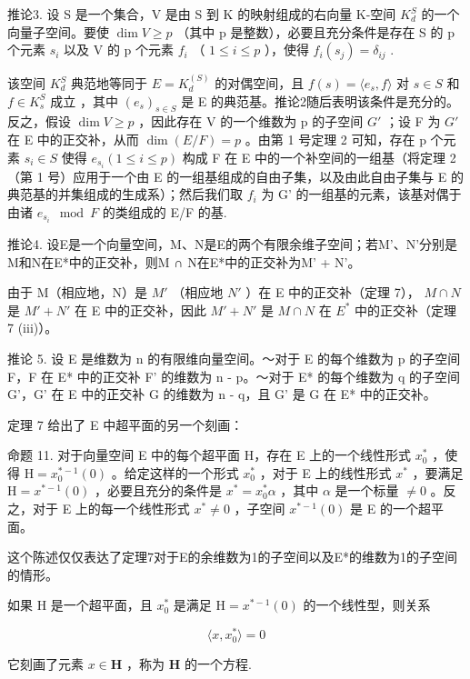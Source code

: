 推论3. 设 S 是一个集合，V 是由 S 到 K 的映射组成的右向量 K-空间 \(K_{d}^{S}\) 的一个向量子空间。要使 \(\dim V \geqslant p\) （其中 p 是整数），必要且充分条件是存在 S 的 p 个元素 \(s_{i}\) 以及 V 的 p 个元素 \(f_{i}\) （ \(1 \leqslant i \leqslant p\) ），使得 \(f_{i}(s_{j}) = \delta_{ij}\) .

该空间 \(K_{d}^{S}\) 典范地等同于 \(E = K_{d}^{(S)}\) 的对偶空间，且 \(f(s) = \langle e_{s}, f \rangle\) 对 \(s \in S\) 和 \(f \in K_{s}^{S}\) 成立 ，其中 \((e_{s})_{s \in S}\) 是 E 的典范基。推论2随后表明该条件是充分的。反之，假设 \(\dim V \geqslant p\) ，因此存在 V 的一个维数为 p 的子空间 \(G'\) ；设 F 为 \(G'\) 在 E 中的正交补，从而 \(\dim(E/F) = p\) 。由第 1 号定理 2 可知，存在 p 个元素 \(s_{i} \in S\) 使得 \(e_{s_{i}} (1 \leqslant i \leqslant p)\) 构成 F 在 E 中的一个补空间的一组基（将定理 2（第 1 号）应用于一个由 E 的一组基组成的自由子集，以及由此自由子集与 E 的典范基的并集组成的生成系）；然后我们取 \(f_{i}\) 为 G' 的一组基的元素，该基对偶于由诸 \(e_{s_{i}} \mod F\) 的类组成的 E/F 的基.

推论4. 设E是一个向量空间，M、N是E的两个有限余维子空间；若M'、N'分别是M和N在E*中的正交补，则M ∩ N在E*中的正交补为M' + N'。

由于 M（相应地，N）是 \(M'\) （相应地 \(N'\) ）在 E 中的正交补（定理 7）， \(M \cap N\) 是 \(M' + N'\) 在 E 中的正交补，因此 \(M' + N'\) 是 \(M \cap N\) 在 \(E^*\) 中的正交补（定理 7 (iii)）。

推论 5. 设 E 是维数为 n 的有限维向量空间。～对于 E 的每个维数为 p 的子空间 F，F 在 E* 中的正交补 F' 的维数为 n - p。～对于 E* 的每个维数为 q 的子空间 G'，G' 在 E 中的正交补 G 的维数为 n - q，且 G' 是 G 在 E* 中的正交补。

定理 7 给出了 E 中超平面的另一个刻画：

命题 11. 对于向量空间 E 中的每个超平面 H，存在 E 上的一个线性形式 \(x_0^*\) ，使得 \(\mathrm{H} = x_0^{*-1}(0)\) 。给定这样的一个形式 \(x_0^*\) ，对于 E 上的线性形式 \(x^*\) ，要满足 \(\mathrm{H} = x^{*-1}(0)\) ，必要且充分的条件是 \(x^* = x_0^*\alpha\) ，其中 \(\alpha\) 是一个标量 \(\neq 0\) 。反之，对于 E 上的每一个线性形式 \(x^* \neq 0\) ，子空间 \(x^{*-1}(0)\) 是 E 的一个超平面。

这个陈述仅仅表达了定理7对于E的余维数为1的子空间以及E*的维数为1的子空间的情形。

如果 H 是一个超平面，且 \(x_{0}^{*}\) 是满足 \(\mathrm{H}=x^{*-1}(0)\) 的一个线性型，则关系

\[
\langle x, x _ {0} ^ {*} \rangle = 0
\]

它刻画了元素 \(x \in \mathbf{H}\) ，称为 \(\mathbf{H}\) 的一个方程.

